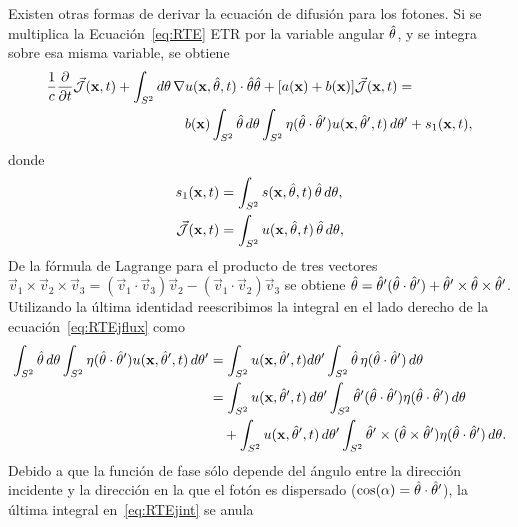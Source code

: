 Existen otras formas de derivar la ecuación de difusión para los fotones. 
Si se multiplica la Ecuación~\eqref{eq:RTE} ETR por la variable angular $\hat{\theta}$, y se integra 
sobre esa misma variable, se obtiene
\begin{equation}
\begin{split}
\begin{aligned}
\frac{1}{c}\frac{\partial}{\partial t} \vec{ \mathcal{J}}(\mathbf{x},t)+\int_{S^2} d\theta \, \nabla & u(\mathbf{x},\hat{\theta},t) \cdot \hat{\theta} \hat{\theta} 
+[a(\mathbf{x})+b(\mathbf{x})]\vec{ \mathcal{J}}(\mathbf{x},t)=\\
&b(\mathbf{x})\int_{S^2} \hat{\theta} \,  d\theta \int_{S^2} \eta(\hat{\theta} \cdot \hat{\theta}')  u(\mathbf{x},\hat{\theta}',t) \, d\theta' + s_1(\mathbf{x},t),
\end{aligned}
\end{split}
\label{eq:RTEjflux}
\end{equation}
donde
\begin{equation}
\begin{split}
\begin{aligned}
s_1(\mathbf{x},t)&=\int_{S^2} s(\mathbf{x},\hat{\theta},t)  \, \hat{\theta} \,  d\theta,\\
 \vec{ \mathcal{J}}(\mathbf{x},t)&=\int_{S^2} u(\mathbf{x},\hat{\theta},t) \, \hat{\theta} \, d\theta,
\label{eq:RTEsflux1}
\end{aligned}
\end{split}
\end{equation}
De la fórmula de Lagrange para el producto de tres vectores $\vec{v}_1 \times \vec{v}_2 \times \vec{v}_3=(\vec{v}_1\cdot \vec{v}_3) \vec{v}_2-(\vec{v}_1 \cdot \vec{v}_2) \vec{v}_3$ 
se obtiene  $\hat{\theta}= \hat{\theta}'(\hat{\theta}\cdot \hat{\theta}') + \hat{\theta}' \times\hat{\theta} \times \hat{\theta}'$.
Utilizando la última identidad reescribimos la integral en el lado derecho de la ecuación~\eqref{eq:RTEjflux} como
\begin{equation}
\begin{split}
\begin{aligned}
\int_{S^2} \hat{\theta} \, d\theta \int_{S^2} \eta(\hat{\theta} \cdot \hat{\theta}')  u(\mathbf{x},\hat{\theta}',t) \, d\theta' 
&=\int_{S^2} u(\mathbf{x},\hat{\theta}',t) d\theta'  \int_{S^2} \hat{\theta}  \, \eta(\hat{\theta} \cdot \hat{\theta}') \, d\theta\\
&=\int_{S^2} u(\mathbf{x},\hat{\theta}',t) \, d\theta' \int_{S^2} \hat{\theta}' (\hat{\theta} \cdot \hat{\theta}') \eta(\hat{\theta} \cdot \hat{\theta}') \, d\theta \\
&\quad+ \int_{S^2} u(\mathbf{x},\hat{\theta}',t) \, d\theta' \int_{S^2}  \hat{\theta}' \times(\hat{\theta} \times \hat{\theta}') \eta(\hat{\theta} \cdot \hat{\theta}') \, d\theta .
\end{aligned}
\end{split}
\label{eq:RTEjint}
\end{equation}
Debido a que la función de fase sólo depende del ángulo entre 
la dirección incidente y la dirección en la que el fotón es dispersado ($\cos(\alpha)=\hat{\theta} \cdot \hat{\theta}'$), la última integral en~\eqref{eq:RTEjint} se anula
